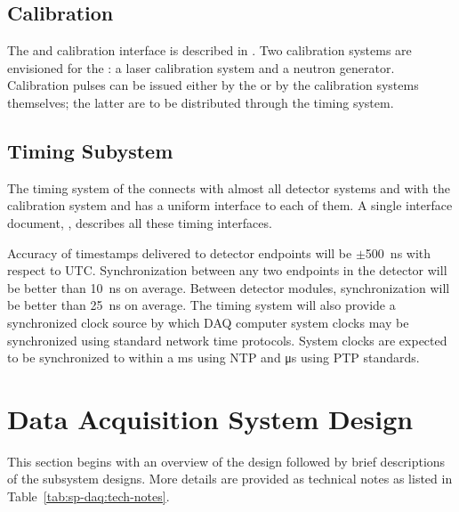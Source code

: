 \subsection{Calibration}

The  and calibration interface is described in
. Two calibration systems are envisioned for the
: a laser calibration system and a neutron
generator. Calibration pulses can be issued either by the  or by
the calibration systems themselves;  %
the latter are to be distributed through the
 timing system.

\subsection{Timing Subystem}

The timing system of the   connects with
almost all detector systems and with the calibration system and has a uniform interface to each of
them.
A single interface document,
, describes all these timing interfaces. 

Accuracy of timestamps delivered to  detector endpoints will be $\pm$\SI{500}{\nano\second} with respect to UTC.  Synchronization between any two endpoints in the detector will be better than \SI{10}{\nano\second} on average.   Between detector modules, synchronization will be better than \SI{25}{\nano\second} on average.  The timing system will also provide a synchronized clock source by which DAQ computer system clocks may be synchronized using standard network time protocols.  System clocks are expected to be synchronized to within a \si{\milli\second} using NTP and \si{\micro\second} using PTP standards. 


\section{Data Acquisition System Design}
\label{sec:fd-daq:design}

This section begins with an overview of the  design followed by %
brief descriptions of the subsystem designs. More details are provided
as technical notes as listed in Table~\ref{tab:sp-daq:tech-notes}. 

